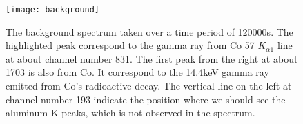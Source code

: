 \documentclass[12pt]{article}
\begin{document}
\begin{figure}[H]
\begin{center}
\texttt{[image: background]}
\label{Fig. 5}
\caption{The background spectrum taken over a time period of 120000s. The highlighted peak correspond to the gamma ray from Co 57 $K_{\alpha 1}$ line at about channel number 831. The first peak from the right at about 1703 is also from Co. It correspond to the 14.4keV gamma ray emitted from Co's radioactive decay. The vertical line on the left at channel number 193 indicate the position where we should see the aluminum K peaks, which is not observed in the spectrum.}
\end{center}
\end{figure}
\end{document}
